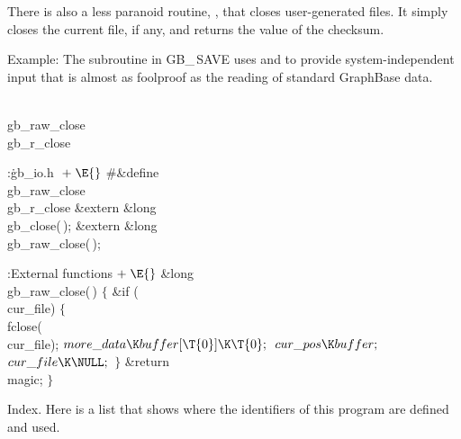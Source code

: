 There is also a less paranoid routine, , that
closes user-generated files. It simply closes the current file, if any,
and returns the value of the  checksum.

Example: The  subroutine in {\sc GB\_\,SAVE} uses
 and  to provide
system-independent input
that is almost as foolproof as the reading of standard GraphBase data.

\fi

\B\D\\{gb\_raw\_close}\5
\\{gb\_r\_close}\par
\Y\B\4:\.{gb\_io.h }\X${}\mathrel+\E{}$\6
\8\#\&{define} \\{gb\_raw\_close}\5\\{gb\_r\_close}\6
\&{extern} \&{long} \\{gb\_close}(\,);\6
\&{extern} \&{long} \\{gb\_raw\_close}(\,);\par
\fi

\B{}:External functions\X${}\mathrel+\E{}$\6
\1\1\&{long} \\{gb\_raw\_close}(\,)\2\2\6
${}\{{}$\1\6
\&{if} (\\{cur\_file})\5
${}\{{}$\1\6
\\{fclose}(\\{cur\_file});\6
${}\\{more\_data}\K\\{buffer}[\T{0}]\K\T{0};{}$\6
${}\\{cur\_pos}\K\\{buffer};{}$\6
${}\\{cur\_file}\K\NULL;{}$\6
\4${}\}{}$\2\6
\&{return} \\{magic};\6
\4${}\}{}$\2\par
\fi

Index. Here is a list that shows where the identifiers of this program
are
defined and used.
\fi

\inx
\fin
\con
